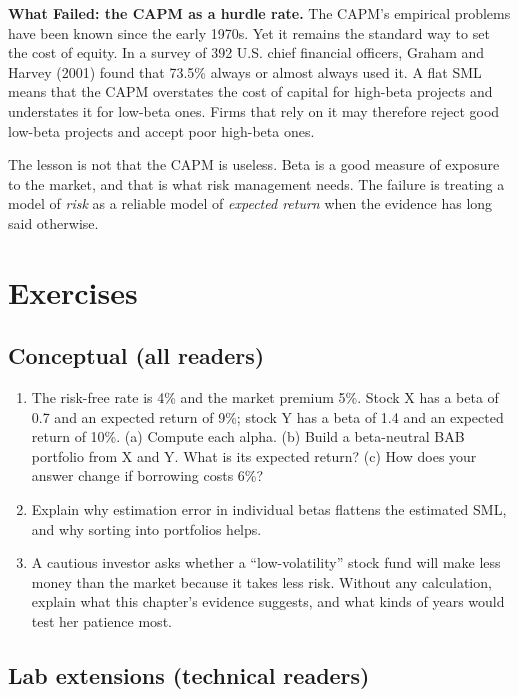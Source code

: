 \begin{callout}
\textbf{What Failed: the CAPM as a hurdle rate.} The CAPM's empirical problems have been known since the early 1970s. Yet it remains the standard way to set the cost of equity. In a survey of 392 U.S. chief financial officers, Graham and Harvey (2001) found that 73.5\% always or almost always used it. A flat SML means that the CAPM overstates the cost of capital for high-beta projects and understates it for low-beta ones. Firms that rely on it may therefore reject good low-beta projects and accept poor high-beta ones.

The lesson is not that the CAPM is useless. Beta is a good measure of exposure to the market, and that is what risk management needs. The failure is treating a model of \emph{risk} as a reliable model of \emph{expected return} when the evidence has long said otherwise.
\end{callout}

\section*{Exercises}

\subsection*{Conceptual (all readers)}

\begin{enumerate}
  \item The risk-free rate is 4\% and the market premium 5\%. Stock X has a beta of 0.7 and an expected return of 9\%; stock Y has a beta of 1.4 and an expected return of 10\%. (a) Compute each alpha. (b) Build a beta-neutral BAB portfolio from X and Y. What is its expected return? (c) How does your answer change if borrowing costs 6\%?
  \item Explain why estimation error in individual betas flattens the estimated SML, and why sorting into portfolios helps.
  \item A cautious investor asks whether a ``low-volatility'' stock fund will make less money than the market because it takes less risk. Without any calculation, explain what this chapter's evidence suggests, and what kinds of years would test her patience most.
\end{enumerate}

\subsection*{Lab extensions (technical readers)}

